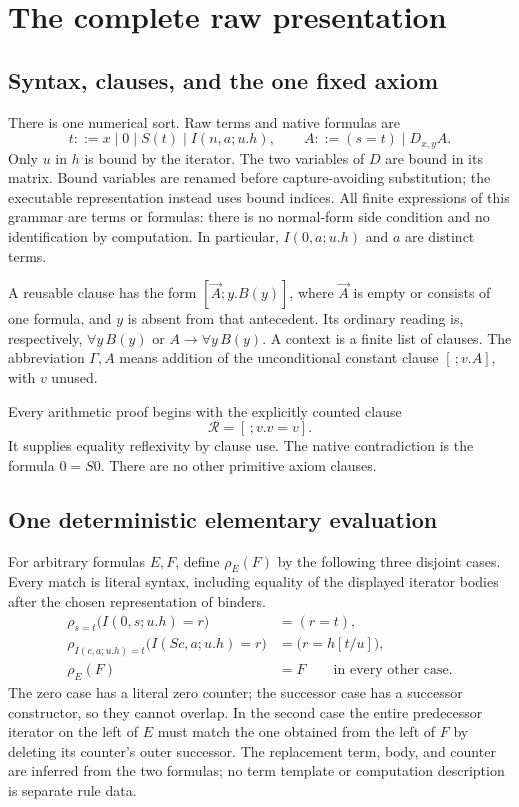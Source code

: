 \section{The complete raw presentation}
\label{sec:raw}

\subsection{Syntax, clauses, and the one fixed axiom}

There is one numerical sort. Raw terms and native formulas are
\[
 t::=x\mid 0\mid S(t)\mid I(n,a;u.h),
 \qquad A::=(s=t)\mid D_{x,y}A.
\]
Only $u$ in $h$ is bound by the iterator. The two variables of $D$ are
bound in its matrix. Bound variables are renamed before capture-avoiding
substitution; the executable representation instead uses bound indices.
All finite expressions of this grammar are terms or formulas: there is
no normal-form side condition and no identification by computation.
In particular, $I(0,a;u.h)$ and $a$ are distinct terms.

A reusable clause has the form $[\vec A;y.B(y)]$, where $\vec A$ is empty
or consists of one formula, and $y$ is absent from that antecedent.
Its ordinary reading is, respectively, $\forall y\,B(y)$ or
$A\to\forall y\,B(y)$. A context is a finite list of clauses. The
abbreviation $\Gamma,A$ means addition of the unconditional constant
clause $[\,;v.A]$, with $v$ unused.

Every arithmetic proof begins with the explicitly counted clause
\[
                  \boxed{\mathcal R=[\,;v.v=v].}
\]
It supplies equality reflexivity by clause use. The native contradiction
is the formula $0=S0$. There are no other primitive axiom clauses.

\subsection{One deterministic elementary evaluation}

For arbitrary formulas $E,F$, define $\rho_E(F)$ by the following three
disjoint cases. Every match is literal syntax, including equality of the
displayed iterator bodies after the chosen representation of binders.
\begin{align}
 \rho_{s=t}\bigl(I(0,s;u.h)=r\bigr)&=(r=t),
       \tag{Z}\label{eq:rho-zero}\\
 \rho_{I(c,a;u.h)=t}\bigl(I(Sc,a;u.h)=r\bigr)
       &=\bigl(r=h[t/u]\bigr),
       \tag{S}\label{eq:rho-succ}\\
 \rho_E(F)&=F\qquad\text{in every other case}.
       \tag{Id}\label{eq:rho-id}
\end{align}
The zero case has a literal zero counter; the successor case has a
successor constructor, so they cannot overlap. In the second case the
entire predecessor iterator on the left of $E$ must match the one obtained
from the left of $F$ by deleting its counter's outer successor.
The replacement term, body, and counter are inferred from the two formulas;
no term template or computation description is separate rule data.

